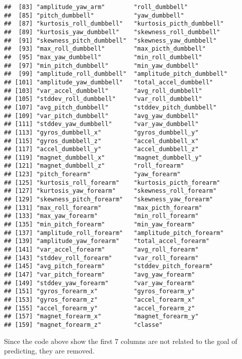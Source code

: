 \documentclass[]{article}
\begin{document}
\begin{verbatim}
##  [83] "amplitude_yaw_arm"        "roll_dumbbell"           
##  [85] "pitch_dumbbell"           "yaw_dumbbell"            
##  [87] "kurtosis_roll_dumbbell"   "kurtosis_picth_dumbbell" 
##  [89] "kurtosis_yaw_dumbbell"    "skewness_roll_dumbbell"  
##  [91] "skewness_pitch_dumbbell"  "skewness_yaw_dumbbell"   
##  [93] "max_roll_dumbbell"        "max_picth_dumbbell"      
##  [95] "max_yaw_dumbbell"         "min_roll_dumbbell"       
##  [97] "min_pitch_dumbbell"       "min_yaw_dumbbell"        
##  [99] "amplitude_roll_dumbbell"  "amplitude_pitch_dumbbell"
## [101] "amplitude_yaw_dumbbell"   "total_accel_dumbbell"    
## [103] "var_accel_dumbbell"       "avg_roll_dumbbell"       
## [105] "stddev_roll_dumbbell"     "var_roll_dumbbell"       
## [107] "avg_pitch_dumbbell"       "stddev_pitch_dumbbell"   
## [109] "var_pitch_dumbbell"       "avg_yaw_dumbbell"        
## [111] "stddev_yaw_dumbbell"      "var_yaw_dumbbell"        
## [113] "gyros_dumbbell_x"         "gyros_dumbbell_y"        
## [115] "gyros_dumbbell_z"         "accel_dumbbell_x"        
## [117] "accel_dumbbell_y"         "accel_dumbbell_z"        
## [119] "magnet_dumbbell_x"        "magnet_dumbbell_y"       
## [121] "magnet_dumbbell_z"        "roll_forearm"            
## [123] "pitch_forearm"            "yaw_forearm"             
## [125] "kurtosis_roll_forearm"    "kurtosis_picth_forearm"  
## [127] "kurtosis_yaw_forearm"     "skewness_roll_forearm"   
## [129] "skewness_pitch_forearm"   "skewness_yaw_forearm"    
## [131] "max_roll_forearm"         "max_picth_forearm"       
## [133] "max_yaw_forearm"          "min_roll_forearm"        
## [135] "min_pitch_forearm"        "min_yaw_forearm"         
## [137] "amplitude_roll_forearm"   "amplitude_pitch_forearm" 
## [139] "amplitude_yaw_forearm"    "total_accel_forearm"     
## [141] "var_accel_forearm"        "avg_roll_forearm"        
## [143] "stddev_roll_forearm"      "var_roll_forearm"        
## [145] "avg_pitch_forearm"        "stddev_pitch_forearm"    
## [147] "var_pitch_forearm"        "avg_yaw_forearm"         
## [149] "stddev_yaw_forearm"       "var_yaw_forearm"         
## [151] "gyros_forearm_x"          "gyros_forearm_y"         
## [153] "gyros_forearm_z"          "accel_forearm_x"         
## [155] "accel_forearm_y"          "accel_forearm_z"         
## [157] "magnet_forearm_x"         "magnet_forearm_y"        
## [159] "magnet_forearm_z"         "classe"
\end{verbatim}

Since the code above show the first 7 columns are not related to the
goal of predicting, they are removed.
\end{document}
